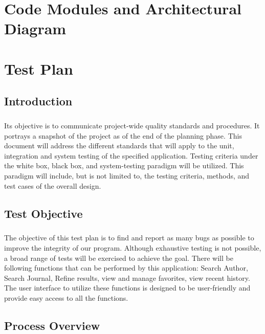 \documentclass[12pts]{scrreprt}
\begin{document}
\chapter{Code Modules and Architectural Diagram}

\chapter{Test Plan}
\section{Introduction}
\paragraph{}
Its objective is to communicate project-wide quality standards and procedures. It portrays a snapshot of the project as of the end of the planning phase. This document will address the different standards that will apply to the unit, integration and system testing of the specified application. Testing criteria under the white box, black box, and system-testing paradigm will be utilized. This paradigm will include, but is not limited to, the testing criteria, methods, and test cases of the overall design.
\section{Test Objective}
\paragraph{}
The objective of this test plan is to find and report as many bugs as possible to improve the integrity of our program. Although exhaustive testing is not possible, a broad range of tests will be exercised to achieve the goal. There will be following functions that can be performed by this application: Search Author, Search Journal, Refine results, view and manage favorites, view recent history. The user interface to utilize these functions is designed to be user-friendly and provide easy access to all the functions.
\section{Process Overview}
\end{document}
